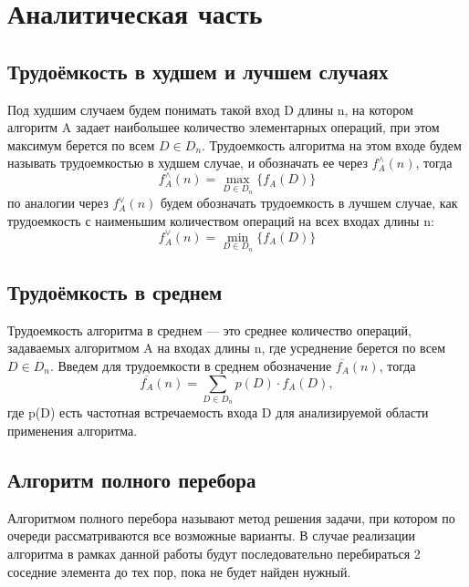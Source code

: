 \chapter{Аналитическая часть}

\section{Трудоёмкость в худшем и лучшем случаях}
Под худшим случаем будем понимать такой вход D длины n, на котором алгоритм A задает наибольшее количество элементарных операций, при этом максимум берется по всем $D \in D_{n}$. Трудоемкость алгоритма на этом входе будем называть трудоемкостью в худшем случае, и обозначать ее через ${f^\wedge_{A}}(n)$, тогда
\begin{equation}
	\label{for:formula1}
	{f^\wedge_{A}}(n) = \max_{D \in D_{n}}\{f_{A}(D)\}
\end{equation}
по аналогии через ${f^\vee_{A}}(n)$ будем обозначать трудоемкость в лучшем случае, как 
трудоемкость с наименьшим количеством операций на всех входах длины n:
\begin{equation}
	\label{for:formula2}
	{f^\vee_{A}}(n) = \min_{D \in D_{n}}\{f_{A}(D)\}
\end{equation}
\section{Трудоёмкость в среднем}

Трудоемкость алгоритма в среднем --- это среднее количество операций, задаваемых алгоритмом A на входах длины n, где усреднение берется по всем $D \in D_{n}$. 
Введем для трудоемкости в среднем обозначение $\overline{f_{A}}(n)$, тогда
\begin{equation}
	\label{for:formula3}
	\overline{f_{A}}(n) = \sum_{D \in D_{n}} p(D) \cdot f_{A}(D),
\end{equation}
где p(D) есть частотная встречаемость входа D для анализируемой области применения алгоритма. 

\section{Алгоритм полного перебора}
Алгоритмом полного перебора называют метод решения задачи, при котором по очереди рассматриваются все возможные варианты. 
В случае реализации алгоритма в рамках данной работы будут последовательно перебираться 2 соседние элемента до тех пор, пока не будет найден нужный.
